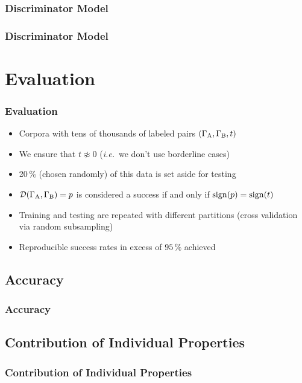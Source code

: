 \documentclass{beamer}
\begin{document}
\begin{frame}
  \frametitle{Discriminator Model}
  \begin{center}
  \end{center}
\end{frame}

\begin{frame}
  \frametitle{Discriminator Model}
  \begin{center}
  \end{center}
\end{frame}

\section{Evaluation}
\begin{frame}
  \frametitle{Evaluation}
  \begin{itemize}
  \item Corpora with tens of thousands of labeled pairs \((\Gamma_\mathrm{A},\Gamma_\mathrm{B},t)\)
  \item We ensure that \(t\not\approx0\) (\emph{i.e.}~we don't use borderline cases)
  \item 20\,\% (chosen randomly) of this data is set aside for testing
  \item \(\mathcal{D}(\Gamma_\mathrm{A},\Gamma_\mathrm{B})=p\) is considered a success if and only if
    \(\operatorname{sign}(p)=\operatorname{sign}(t)\)
  \item Training and testing are repeated with different partitions (cross validation via random subsampling)
  \item Reproducible success rates in excess of \(95\,\%\) achieved
  \end{itemize}
\end{frame}

\subsection{Accuracy}
\begin{frame}
  \frametitle{Accuracy}
\end{frame}

\subsection{Contribution of Individual Properties}
\begin{frame}
  \frametitle{Contribution of Individual Properties}
\end{frame}
\end{document}
